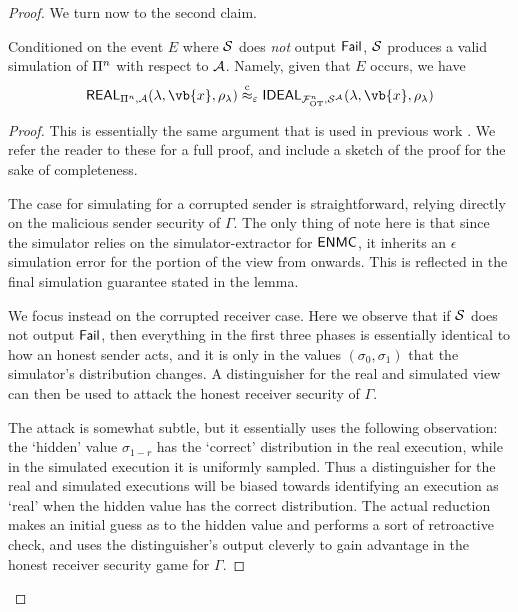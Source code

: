 \begin{proof}
We turn now to the second claim. 

\begin{lemma}\label{lem:malOT:cond}
    Conditioned on the event $E$ where $\mathcal{S}$ does {\em not} output $\mathsf{Fail}$, $\mathcal{S}$ produces a valid simulation of $\mathrm{\Pi}^n$ with respect to $\mathcal{A}$. Namely, given that $E$ occurs, we have 
    $$\REAL_{\Prot^n, \Adv}(\secpar, \vb{x}, \rho_\secpar) \cind_\epsilon \IDEAL_{\mathcal{F}^n_{\text{OT}}, \Sim^\Adv}(\secpar, \vb{x}, \rho_\secpar)$$
\end{lemma}

\begin{proof}
    This is essentially the same argument that is used in previous work \cite{FOCS:Wee10,STOC:IKLP06}. We refer the reader to these for a full proof, and include a sketch of the proof for the sake of completeness. 
    
    The case for simulating for a corrupted sender is straightforward, relying directly on the malicious sender security of $\Gamma$. The only thing of note here is that since the simulator relies on the simulator-extractor for $\mathsf{ENMC}$, it inherits an $\epsilon$ simulation error for the portion of the view from  onwards. This is reflected in the final simulation guarantee stated in the lemma.  
    
    We focus instead on the corrupted receiver case. Here we observe that if $\mathcal{S}$ does not output $\mathsf{Fail}$, then everything in the first three phases is essentially identical to how an honest sender acts, and it is only in the values $(\sigma_0,\sigma_1)$ that the simulator's distribution changes. A distinguisher for the real and simulated view can then be used to attack the honest receiver security of $\Gamma$. 

    The attack is somewhat subtle, but it essentially uses the following observation: the `hidden' value $\sigma_{1-r}$ has the `correct' distribution in the real execution, while in the simulated execution it is uniformly sampled. Thus a distinguisher for the real and simulated executions will be biased towards identifying an execution as `real' when the hidden value has the correct distribution. The actual reduction makes an initial guess as to the hidden value and performs a sort of retroactive check, and uses the distinguisher's output cleverly to gain advantage in the honest receiver security game for $\Gamma$. 


\end{proof}
\end{proof}
